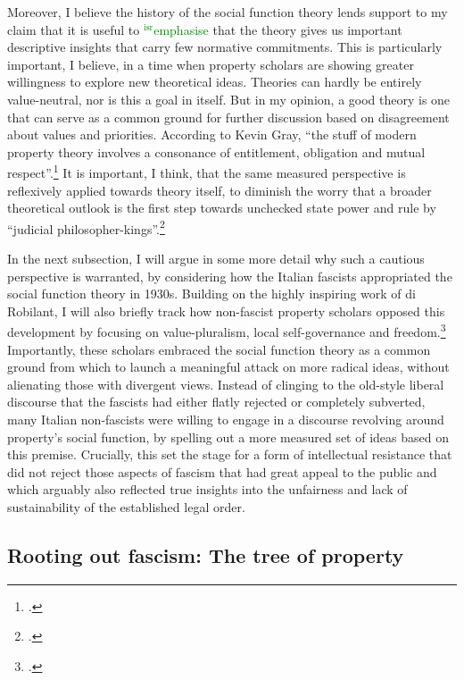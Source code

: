 \documentclass[12pt,a4paper]{book} %
\newcommand{\isr}[1]{\textcolor{green}{$^{\textrm{isr}}${#1}}}
\begin{document}
Moreover, I believe the history of the social function theory lends support to my claim that it is useful to \isr{emphasise} that the theory gives us important descriptive insights that carry few normative commitments. This is particularly important, I believe, in a time when property scholars are showing greater willingness to explore new theoretical ideas. Theories can hardly be entirely value-neutral, nor is this a goal in itself. But in my opinion, a good theory is one that can serve as a common ground for further discussion based on disagreement about values and priorities. According to Kevin Gray, ``the stuff of modern property theory involves a consonance of entitlement, obligation and mutual respect''.\footcite[37]{gray11} It is important, I think, that the same measured perspective is reflexively applied towards theory itself, to diminish the worry that a broader theoretical outlook is the first step towards unchecked state power and rule by ``judicial philosopher-kings''.\footcite[944]{claeys09}

In the next subsection, I will argue in some more detail why such a cautious perspective is warranted, by considering how the Italian fascists appropriated the social function theory in 1930s. Building on the highly inspiring work of di Robilant, I will also briefly track how non-fascist property scholars opposed this development by focusing on value-pluralism, local self-governance and freedom.\footcite{robilant13} Importantly, these scholars embraced the social function theory as a common ground from which to launch a meaningful attack on more radical ideas, without alienating those with divergent views. Instead of clinging to the old-style liberal discourse that the fascists had either flatly rejected or completely subverted, many Italian non-fascists were willing to engage in a discourse revolving around property's social function, by spelling out a more measured set of ideas based on this premise. Crucially, this set the stage for a form of intellectual resistance that did not reject those aspects of fascism that had great appeal to the public and which arguably also reflected true insights into the unfairness and lack of sustainability of the established legal order.

\subsection{Rooting out fascism: {T}he tree of property}
\end{document}
